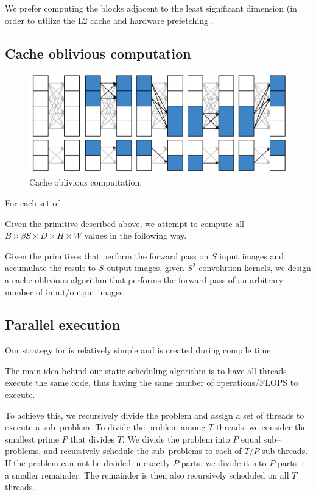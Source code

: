  We prefer computing the blocks adjacent to the least significant
  dimension (in order to utilize the L2 cache and hardware prefetching
  .

  \subsection{Cache oblivious computation}


  \begin{figure}
    \begin{center}
      \includegraphics[width=0.8\linewidth]{fig/serialexec}
    \end{center}
    \caption{Cache oblivious compuitation.}
    \label{fig:full-exec}
  \end{figure}


  For each set of

  Given the primitive described above, we attempt to compute all $B
  \times \beta S \times D \times H \times W$ values in the following
  way.

  Given the primitives that perform the forward pass on $S$ input
  images and accumulate the result to $S$ output images, given $S^2$
  convolution kernels, we design a cache oblivious algorithm that
  performs the forward pass of an arbitrary number of input/output
  images.


  \subsection{Parallel execution}

  Our strategy for is relatively simple and is created during compile
  time.

  The main idea behind our static scheduling algorithm is to have all
  threads execute the same code, thus having the same number of
  operations/FLOPS to execute.

  To achieve this, we recursively divide the problem and assign a set
  of threads to execute a sub--problem.  To divide the problem among
  $T$ threads, we consider the smallest prime $P$ that divides $T$.
  We divide the problem into $P$ equal sub--problems, and recursively
  schedule the sub--problems to each of $T/P$ sub-threads.  If the
  problem can not be divided in exactly $P$ parts, we divide it into
  $P$ parts + a smaller remainder.  The remainder is then also
  recursively scheduled on all $T$ threads.

